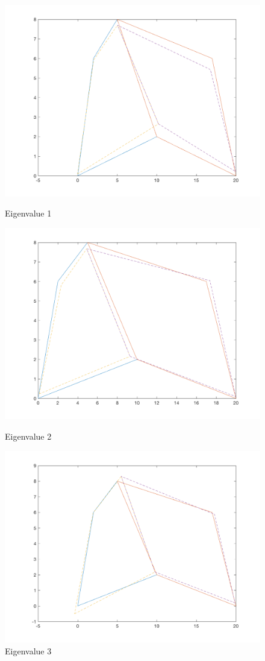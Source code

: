 \documentclass[11pt]{amsart}
\begin{document}
\begin{figure}[H] 
  \label{fig4} 
  \begin{minipage}[b]{0.5\linewidth}
    \centering
    \includegraphics[width=.5\linewidth]{eigenvectors/eigenvector_1_redint.png} 
    \caption{Eigenvalue 1} 
    \vspace{4ex}
  \end{minipage}%
  \begin{minipage}[b]{0.5\linewidth}
    \centering
    \includegraphics[width=.5\linewidth]{eigenvectors/eigenvector_2_redint.png} 
    \caption{Eigenvalue 2} 
    \vspace{4ex}
  \end{minipage} 
  \begin{minipage}[b]{0.5\linewidth}
    \centering
    \includegraphics[width=.5\linewidth]{eigenvectors/eigenvector_3_redint.png} 
    \caption{Eigenvalue 3} 
    \vspace{4ex}
  \end{minipage}%
  \begin{minipage}[b]{0.5\linewidth}

\end{minipage}
\end{figure}
\end{document}
